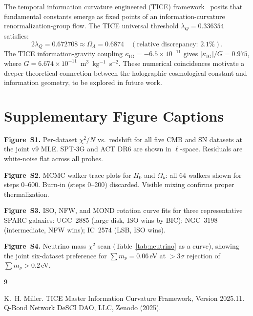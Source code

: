\documentclass[12pt,a4paper]{article}
\newcommand{\OmL}{\Omega_\Lambda}
\begin{document}
The temporal information curvature engineered (TICE) framework~\cite{Miller2025}
posits that fundamental constants emerge as fixed points of an information-curvature
renormalization-group flow.
The TICE universal threshold $\lambda_Q = 0.336354$ satisfies:
\begin{equation}
2\lambda_Q = 0.672708 \approx \OmL = 0.6874 \quad
(\text{relative discrepancy: } 2.1\%).
\end{equation}
The TICE information-gravity coupling $\kappa_\mathrm{IG} = -6.5\times 10^{-11}$
gives $|\kappa_\mathrm{IG}|/G = 0.975$, where $G = 6.674\times 10^{-11}$~m$^3$~kg$^{-1}$~s$^{-2}$.
These numerical coincidences motivate a deeper theoretical connection between
the holographic cosmological constant and information geometry, to be explored
in future work.

\section{Supplementary Figure Captions}
\label{sec:figcaptions}

\textbf{Figure~S1.} Per-dataset $\chi^2/N$ vs.\ redshift for all five CMB
and SN datasets at the joint v9 MLE. SPT-3G and ACT DR6 are shown in
$\ell$-space. Residuals are white-noise flat across all probes.

\textbf{Figure~S2.} MCMC walker trace plots for $H_0$ and $\Omega_k$:
all 64 walkers shown for steps 0--600. Burn-in (steps 0--200) discarded.
Visible mixing confirms proper thermalization.

\textbf{Figure~S3.} ISO, NFW, and MOND rotation curve fits for three
representative SPARC galaxies: UGC~2885 (large disk, ISO wins by BIC);
NGC~3198 (intermediate, NFW wins); IC~2574 (LSB, ISO wins).

\textbf{Figure~S4.} Neutrino mass $\chi^2$ scan (Table~\ref{tab:neutrino}
as a curve), showing the joint six-dataset preference for
$\sum m_\nu = 0.06\,$eV at $>3\sigma$ rejection of $\sum m_\nu > 0.2\,$eV.

\begin{thebibliography}{9}

K.~H. Miller.
\newblock TICE Master Information Curvature Framework, Version 2025.11.
\newblock Q-Bond Network DeSCI DAO, LLC, Zenodo (2025).

\end{thebibliography}
\end{document}
